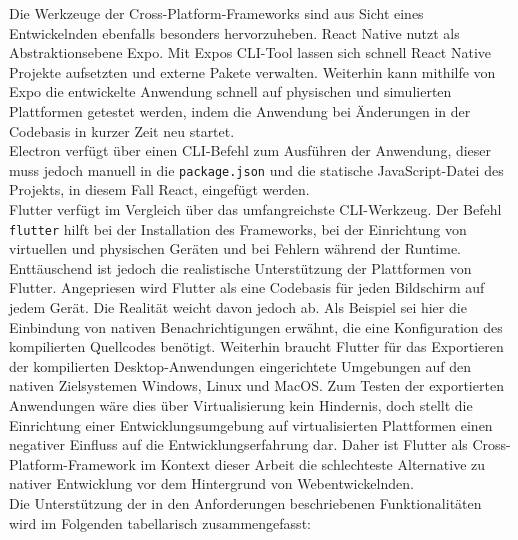 \documentclass[a4paper]{scrartcl}
\begin{document}
Die Werkzeuge der Cross-Platform-Frameworks sind aus Sicht eines Entwickelnden ebenfalls besonders hervorzuheben. React Native nutzt als Abstraktionsebene Expo. Mit Expos CLI-Tool lassen sich schnell React Native Projekte aufsetzten und externe Pakete verwalten. Weiterhin kann mithilfe von Expo die entwickelte Anwendung schnell auf physischen und simulierten Plattformen getestet werden, indem die Anwendung bei Änderungen in der Codebasis in kurzer Zeit neu startet. \\
Electron verfügt über einen CLI-Befehl zum Ausführen der Anwendung, dieser muss jedoch manuell in die \texttt{package.json} und die statische JavaScript-Datei des Projekts, in diesem Fall React, eingefügt werden. \\
Flutter verfügt im Vergleich über das umfangreichste CLI-Werkzeug. Der Befehl \texttt{flutter} hilft bei der Installation des Frameworks, bei der Einrichtung von virtuellen und physischen Geräten und bei Fehlern während der Runtime. \\

Enttäuschend ist jedoch die realistische Unterstützung der Plattformen von Flutter. Angepriesen wird Flutter als eine Codebasis für jeden Bildschirm auf jedem Gerät. Die Realität weicht davon jedoch ab. Als Beispiel sei hier die Einbindung von nativen Benachrichtigungen erwähnt, die eine Konfiguration des kompilierten Quellcodes benötigt. Weiterhin braucht Flutter für das Exportieren der kompilierten Desktop-Anwendungen eingerichtete Umgebungen auf den nativen Zielsystemen Windows, Linux und MacOS. Zum Testen der exportierten Anwendungen wäre dies über Virtualisierung kein Hindernis, doch stellt die Einrichtung einer Entwicklungsumgebung auf virtualisierten Plattformen einen negativer Einfluss auf die Entwicklungserfahrung dar. Daher ist Flutter als Cross-Platform-Framework im Kontext dieser Arbeit die schlechteste Alternative zu nativer Entwicklung vor dem Hintergrund von Webentwickelnden. \\

Die Unterstützung der in den Anforderungen beschriebenen Funktionalitäten wird im Folgenden tabellarisch zusammengefasst:
\end{document}
